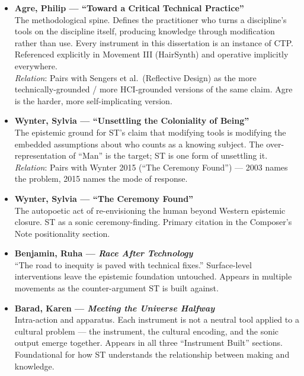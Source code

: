 \begin{itemize}

    \item \textbf{Agre, Philip — ``Toward a Critical Technical Practice''} \parencite{Agre_1998}\\
    The methodological spine. Defines the practitioner who turns a discipline's tools on the discipline itself, producing knowledge through modification rather than use. Every instrument in this dissertation is an instance of CTP. Referenced explicitly in Movement III (HairSynth) and operative implicitly everywhere.\\
    \textit{Relation}: Pairs with Sengers et al.\ (Reflective Design) as the more technically-grounded / more HCI-grounded versions of the same claim. Agre is the harder, more self-implicating version.\\

    \item \textbf{Wynter, Sylvia — ``Unsettling the Coloniality of Being''} \parencite{Wynter_2003}\\
    The epistemic ground for ST's claim that modifying tools is modifying the embedded assumptions about who counts as a knowing subject. The over-representation of ``Man'' is the target; ST is one form of unsettling it.\\
    \textit{Relation}: Pairs with Wynter 2015 (``The Ceremony Found'') — 2003 names the problem, 2015 names the mode of response.

    \item \textbf{Wynter, Sylvia — ``The Ceremony Found''} \parencite{Wynter_2015}\\
    The autopoetic act of re-envisioning the human beyond Western epistemic closure. ST as a sonic ceremony-finding. Primary citation in the Composer's Note positionality section.

    \item \textbf{Benjamin, Ruha — \textit{Race After Technology}} \parencite{Benjamin_2019a}\\
    ``The road to inequity is paved with technical fixes.'' Surface-level interventions leave the epistemic foundation untouched. Appears in multiple movements as the counter-argument ST is built against.

    \item \textbf{Barad, Karen — \textit{Meeting the Universe Halfway}} \parencite{Barad_2007}\\
    Intra-action and apparatus. Each instrument is not a neutral tool applied to a cultural problem — the instrument, the cultural encoding, and the sonic output emerge together. Appears in all three ``Instrument Built'' sections. Foundational for how ST understands the relationship between making and knowledge.


\end{itemize}
